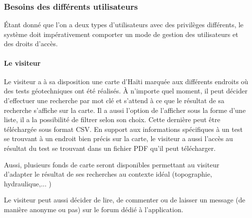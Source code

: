         \subsubsection{Besoins des différents utilisateurs}
        Étant donné que l'on a deux types d'utilisateurs avec des privilèges différents,
        le système doit impérativement comporter un mode de gestion des utilisateurs et des droits d'accès.
        \paragraph{Le visiteur}
        Le visiteur a à sa disposition une carte d'Haïti marquée aux différents endroits où des tests 
        géotechniques ont été réalisés.
        À n'importe quel moment, il peut décider d'effectuer une recherche par mot clé et s'attend
        à ce que le résultat de sa recherche s'affiche sur la carte. Il a aussi l'option de l'afficher sous la forme
        d'une liste, il a la possibilité de filtrer selon son choix. Cette dernière peut être téléchargée sous format CSV.
        En support aux informations spécifiques à un test se trouvant à un endroit bien précis sur la carte,
        le visiteur a aussi l'accès au résultat du test se trouvant dans un fichier PDF qu'il peut télécharger.
        \par
        Aussi, plusieurs fonds de carte seront disponibles permettant au visiteur d'adapter le résultat de ses recherches
        au contexte idéal (topographie, hydraulique,... )
        \par
        Le visiteur peut aussi décider de lire, de commenter ou de laisser un message (de manière anonyme ou pas) sur le forum dédié à l'application.
